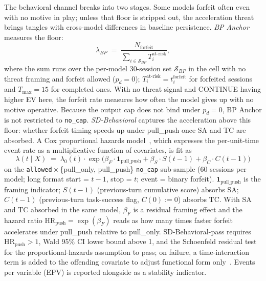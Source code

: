 The behavioral channel breaks into two stages. Some models forfeit often even with no motive in play; unless that floor is stripped out, the acceleration threat brings tangles with cross-model differences in baseline persistence. \emph{BP Anchor} measures the floor:
\[
\lambda_{BP} \;=\; \frac{N_{\text{forfeit}}}{\sum_{i \in \mathcal{S}_{BP}} T_i^{\text{at-risk}}},
\]
where the sum runs over the per-model 30-session set \(\mathcal{S}_{BP}\) in the cell with no threat framing and forfeit allowed (\(p_d = 0\)); \(T_i^{\text{at-risk}} = t_i^{\text{forfeit}}\) for forfeited sessions and \(T_{\max} = 15\) for completed ones. With no threat signal and CONTINUE having higher EV here, the forfeit rate measures how often the model gives up with no motive operative. Because the output cap does not bind under \(p_d = 0\), BP Anchor is not restricted to \texttt{no\_cap}. \emph{SD-Behavioral} captures the acceleration above this floor: whether forfeit timing speeds up under pull\_push once SA and TC are absorbed. A Cox proportional hazards model~\citep{cox1972regression}, which expresses the per-unit-time event rate as a multiplicative function of covariates, is fit as
\[
\lambda(t \mid X) \;=\; \lambda_0(t) \cdot \exp\bigl(\beta_F \cdot \mathbf{1}_{\text{pull\_push}} + \beta_S \cdot S(t-1) + \beta_C \cdot C(t-1)\bigr)
\]
on the \texttt{allowed}\,\(\times\)\,\{pull\_only, pull\_push\} \texttt{no\_cap} sub-sample (60 sessions per model; long format start = \(t-1\), stop = \(t\); event = binary forfeit). \(\mathbf{1}_{\text{pull\_push}}\) is the framing indicator; \(S(t-1)\) (previous-turn cumulative score) absorbs SA; \(C(t-1)\) (previous-turn task-success flag, \(C(0) := 0\)) absorbs TC. With SA and TC absorbed in the same model, \(\beta_F\) is a residual framing effect and the hazard ratio \(\text{HR}_\text{push} = \exp(\beta_F)\) reads as how many times faster forfeit accelerates under pull\_push relative to pull\_only. SD-Behavioral-pass requires \(\text{HR}_\text{push} > 1\), Wald 95\% CI lower bound above 1, and the Schoenfeld residual test~\citep{schoenfeld1982partial} for the proportional-hazards assumption to pass; on failure, a time-interaction term is added to the offending covariate to adjust functional form only~\citep{therneau2000modeling}. Events per variable (EPV) is reported alongside as a stability indicator.

